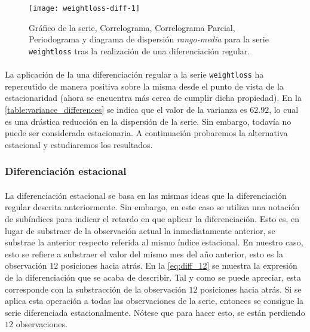 \documentclass[a4paper, spanish]{article}
\begin{document}
        \begin{figure}[htb!]
          \centering
          \texttt{[image: weightloss-diff-1]}
          \caption{Gráfico de la serie, Correlograma, Correlograma Parcial, Periodograma y diagrama de dispersión \emph{rango-media} para la serie \texttt{weightloss} tras la realización de una diferenciación regular.}
          \label{img:weightloss_diff_1}
        \end{figure}

        \paragraph{}
        La aplicación de la una diferenciación regular a la serie \texttt{weightloss} ha repercutido de manera positiva sobre la misma desde el punto de vista de la estacionaridad (ahora se encuentra más cerca de cumplir dicha propiedad). En la \autoref{table:variance_differences} se indica que el valor de la varianza es $62.92$, lo cual es una drástica reducción en la dispersión de la serie. Sin embargo, todavía no puede ser considerada estacionaria. A continuación probaremos la alternativa estacional y estudiaremos los resultados.

      \subsubsection{Diferenciación estacional}
      \label{sec:seasonal_difference}

        \paragraph{}
        La diferenciación estacional se basa en las mismas ideas que la diferenciación regular descrita anteriormente. Sin embargo, en este caso se utiliza una notación de subíndices para indicar el retardo en que aplicar la diferenciación. Esto es, en lugar de substraer de la observación actual la inmediatamente anterior, se substrae la anterior respecto referida al mismo índice estacional. En nuestro caso, esto se refiere a substraer el valor del mismo mes del año anterior, esto es la observación $12$ posiciones hacia atrás. En la \autoref{eq:diff_12} se muestra la expresión de la diferenciación que se acaba de describir. Tal y como se puede apreciar, esta corresponde con la substracción de la observación $12$ posiciones hacia atrás. Si se aplica esta operación a todas las observaciones de la serie, entonces se consigue la serie diferenciada estacionalmente. Nótese que para hacer esto, se están perdiendo $12$ observaciones.
\end{document}

